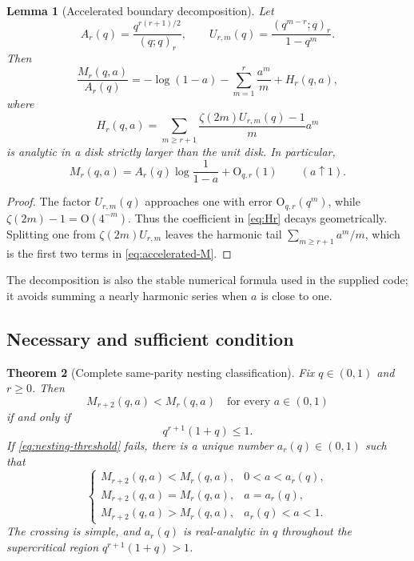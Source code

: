 \documentclass[11pt,oneside]{article}
\numberwithin{equation}{section}
\theoremstyle{frontier}
\newtheorem{theorem}{Theorem}[section]
\newtheorem{lemma}[theorem]{Lemma}
\theoremstyle{definition}
\theoremstyle{remark}
\newcommand{\bigO}{\mathrm O}
\begin{document}
\begin{lemma}[Accelerated boundary decomposition]\label{lem:boundary-decomp}
Let
\[
 A_r(q)=\frac{q^{r(r+1)/2}}{(q;q)_r},\qquad
 U_{r,m}(q)=\frac{(q^{m-r};q)_r}{1-q^m}.
\]
Then
\begin{equation}
 \frac{M_r(q,a)}{A_r(q)}
 =-\log(1-a)-\sum_{m=1}^{r}\frac{a^m}{m}
 +H_r(q,a),
 \label{eq:accelerated-M}
\end{equation}
where
\begin{equation}
 H_r(q,a)=\sum_{m\ge r+1}
 \frac{\zeta(2m)U_{r,m}(q)-1}{m}a^m
 \label{eq:Hr}
\end{equation}
is analytic in a disk strictly larger than the unit disk.  In particular,
\begin{equation}
 M_r(q,a)=A_r(q)\log\frac1{1-a}+\bigO_{q,r}(1)
 \qquad(a\uparrow1).
 \label{eq:Mr-boundary}
\end{equation}
\end{lemma}

\begin{proof}
The factor $U_{r,m}(q)$ approaches one with error $\bigO_{q,r}(q^m)$, while
$\zeta(2m)-1=\bigO(4^{-m})$.  Thus the coefficient in \eqref{eq:Hr} decays
geometrically.  Splitting one from $\zeta(2m)U_{r,m}$ leaves the harmonic tail
$\sum_{m\ge r+1}a^m/m$, which is the first two terms in \eqref{eq:accelerated-M}.
\end{proof}

The decomposition is also the stable numerical formula used in the supplied code; it avoids
summing a nearly harmonic series when $a$ is close to one.

\subsection{Necessary and sufficient condition}

\begin{theorem}[Complete same-parity nesting classification]\label{thm:nesting-classification}
Fix $q\in(0,1)$ and $r\ge0$.  Then
\begin{equation}
 M_{r+2}(q,a)<M_r(q,a)\quad\text{for every }a\in(0,1)
 \label{eq:uniform-nesting}
\end{equation}
if and only if
\begin{equation}
 \boxed{q^{r+1}(1+q)\le1.}
 \label{eq:nesting-threshold}
\end{equation}
If \eqref{eq:nesting-threshold} fails, there is a unique number
$a_r(q)\in(0,1)$ such that
\begin{equation}
 \begin{cases}
 M_{r+2}(q,a)<M_r(q,a),&0<a<a_r(q),\\
 M_{r+2}(q,a)=M_r(q,a),&a=a_r(q),\\
 M_{r+2}(q,a)>M_r(q,a),&a_r(q)<a<1.
 \end{cases}
 \label{eq:crossing-classification}
\end{equation}
The crossing is simple, and $a_r(q)$ is real-analytic in $q$ throughout the supercritical
region $q^{r+1}(1+q)>1$.
\end{theorem}
\end{document}
